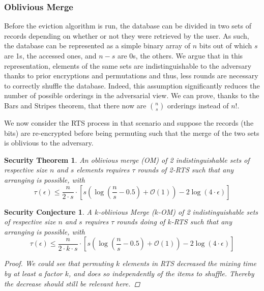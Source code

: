 \documentclass{llncs}
\newtheorem{secthm}{Security Theorem}
\newtheorem{seccjt}{Security Conjecture}
\begin{document}
\subsubsection{Oblivious Merge}
Before the eviction algorithm is run, the database can be divided in two sets of records depending on whether or not they were retrieved by the user. As such, the database can be represented as a simple binary array of $n$ bits out of which $s$ are 1s, the accessed ones, and $n-s$ are 0s, the others.
We argue that in this representation, elements of the same sets are indistinguishable to the adversary thanks to prior encryptions and permutations and thus, less rounds are necessary to correctly shuffle the database.
Indeed, this assumption significantly reduces the number of possible orderings in the adversarial view. We can prove, thanks to the Bars and Stripes theorem, that there now are ${n \choose s}$ orderings instead of $n!$.

We now consider the RTS process in that scenario and suppose the records (the bits) are re-encrypted before being permuting such that the merge of the two sets is oblivious to the adversary.

\begin{secthm}
An oblivious merge (OM) of 2 indistinguishable sets of respective size $n$ and $s$ elements requires $\tau$ rounds of 2-RTS such that any arranging is possible, with
$$\tau(\epsilon) \leq \frac{n}{2\cdot s}  \cdot \left [ s \left( \log \left (\frac{n}{s}-0.5\right) +\mathcal{O}\left(1\right) \right ) - 2\log \left( 4 \cdot \epsilon\right) \right ] $$%
\end{secthm}

\begin{seccjt}
A $k$-oblivious Merge ($k$-OM) of 2 indistinguishable sets of respective size $n$ and $s$ requires $\tau$ rounds doing of $k$-RTS such that any arranging is possible, with
$$ \tau(\epsilon) \leq \frac{n}{2\cdot k \cdot s}  \cdot \left [ s \left( \log \left (\frac{n}{s}-0.5\right) +\mathcal{O}\left(1\right) \right ) - 2\log \left( 4 \cdot \epsilon\right) \right ] $$
\begin{proof}
We could see that permuting $k$ elements in RTS decreased the mixing time by at least a factor $k$, and does so independently of the items to shuffle. Thereby the decrease should still be relevant here.
\end{proof}
\end{seccjt}
%
\end{document}
